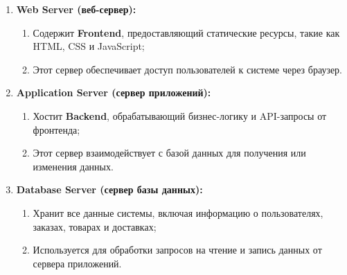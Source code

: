 \documentclass[a4paper]{report}
\begin{document}
\begin{enumerate}
    \item \textbf{Web Server (веб-сервер):}\begin{enumerate}
        \item Содержит \textbf{Frontend}, предоставляющий статические ресурсы, такие как HTML, CSS и JavaScript;
        \item Этот сервер обеспечивает доступ пользователей к системе через браузер.
    \end{enumerate}
    \item \textbf{Application Server (сервер приложений):}\begin{enumerate}
        \item Хостит \textbf{Backend}, обрабатывающий бизнес-логику и API-запросы от фронтенда;
        \item Этот сервер взаимодействует с базой данных для получения или изменения данных.
    \end{enumerate}
    \item \textbf{Database Server (сервер базы данных):}\begin{enumerate}
        \item Хранит все данные системы, включая информацию о пользователях, заказах, товарах и доставках;
        \item Используется для обработки запросов на чтение и запись данных от сервера приложений.
    \end{enumerate}
\end{enumerate}
\end{document}
